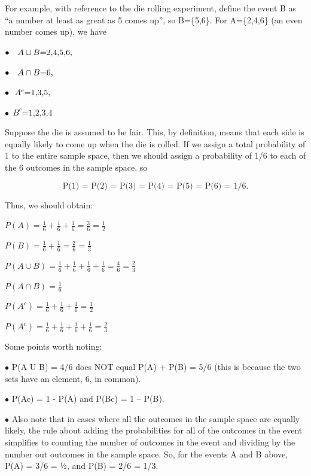 \documentclass[
]{book}
\begin{document}
For example, with reference to the die rolling experiment, define the event B as ``a number at least as great as 5 comes up'', so B=\{5,6\}. For A=\{2,4,6\} (an even number comes up), we have

\(\bullet\ \  \ A \cup B \text{={2,4,5,6},}\\ \\\)

\(\bullet \ \ \ A\cap B \text{={6},}\\ \\\)

\(\bullet \ \ A^c \text{={1,3,5}}, \\\)

\(\bullet \ \ B^c \text{={1,2,3,4}}\)

Suppose the die is assumed to be fair. This, by definition, means that each side is equally likely to come up when the die is rolled. If we assign a total probability of 1 to the entire sample space, then we should assign a probability of 1/6 to each of the 6 outcomes in the sample space, so

\[
\text{P(1) = P(2) = P(3) = P(4) = P(5) = P(6) = 1/6.}
\]

Thus, we should obtain:

\(P(A) = \frac{1}{6}+\frac{1}{6}+\frac{1}{6}=\frac{3}{6}=\frac{1}{2}\)

\(P(B) = \frac{1}{6}+\frac{1}{6}=\frac{2}{6}=\frac{1}{3}\)

\(P(A \cup B) = \frac{1}{6}+\frac{1}{6}+\frac{1}{6}+\frac{1}{6}=\frac{4}{6}=\frac{2}{3}\)

\(P(A \cap B) = \frac{1}{6}\)

\(P(A^c) = \frac{1}{6}+\frac{1}{6}+\frac{1}{6}=\frac{1}{2}\)

\(P(A^c) = \frac{1}{6}+\frac{1}{6}+\frac{1}{6}+\frac{1}{6}=\frac{2}{3}\)

Some points worth noting:

\(\bullet\) P(A U B) = 4/6 does NOT equal P(A) + P(B) = 5/6 (this is because the two sets have an element, 6, in common).

\(\bullet\) P(Ac) = 1 - P(A) and P(Bc) = 1 -- P(B).

\(\bullet\) Also note that in cases where all the outcomes in the sample space are equally likely, the rule about adding the probabilities for all of the outcomes in the event simplifies to counting the number of outcomes in the event and dividing by the number out outcomes in the sample space. So, for the events A and B above, P(A) = 3/6 = 1⁄2, and P(B) = 2/6 = 1/3.
\end{document}
